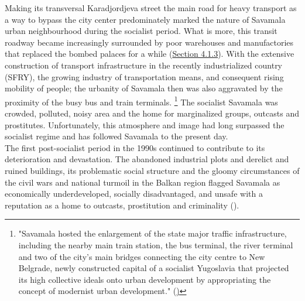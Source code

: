 \documentclass[11pt]{report}
\begin{document}
Making its transversal Karadjordjeva street the main road for heavy transport as a way to bypass the city center predominately marked the nature of Savamala urban neighbourhood during the socialist period.
What is more, this transit roadway became increasingly surrounded by poor warehouses and manufactories that replaced the bombed palaces for a while (\href{Section 4.1.3}{Section 4.1.3}). 
With the extensive construction of transport infrastructure in the recently industrialized country (SFRY), the growing  industry of transportation means, and consequent rising mobility of people; the urbanity of Savamala then was also aggravated by the proximity of the busy bus and train terminals.
\footnote{"Savamala hosted the enlargement of the state major traffic infrastructure, including the nearby main train station, the bus terminal, the river terminal and two of the city’s main bridges connecting the city centre to New Belgrade, newly constructed capital of a socialist Yugoslavia that projected its high collective ideals onto urban development by appropriating the concept of modernist urban development." (\href{ref}{\citealt{cvetinovic_engine_2013})}}
The socialist Savamala was crowded, polluted, noisy area and the home for marginalized groups, outcasts and prostitutes.
Unfortunately, this atmosphere and image had long surpassed the socialist regime and has followed Savamala to the present day.
\\

The first post-socialist period in the 1990s continued to contribute to its deterioration and devastation. The abandoned industrial plots and derelict and ruined buildings, its problematic social structure and the gloomy circumstances of the  civil wars and national turmoil in the Balkan region flagged Savamala as economically underdeveloped, socially disadvantaged, and unsafe with a reputation as a home to outcasts, prostitution and criminality (\href{ref}{\citealt{cvetinovic_engine_2013}}).
\\
\end{document}
